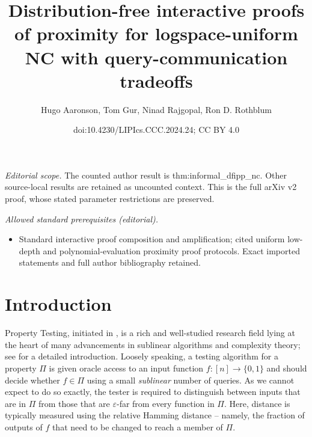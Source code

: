 \documentclass[10pt,a4paper]{article}
\title{Distribution-free interactive proofs of proximity for logspace-uniform NC with query-communication tradeoffs}
\author{Hugo Aaronson, Tom Gur, Ninad Rajgopal, Ron D. Rothblum}
\date{doi:10.4230/LIPIcs.CCC.2024.24; CC BY 4.0}
\begin{document}
\maketitle
\setcounter{section}{1}
\noindent\textit{Editorial scope.} The counted author result is thm:informal\_dfipp\_nc. Other source-local results are retained as uncounted context. This is the full arXiv v2 proof, whose stated parameter restrictions are preserved.\par\medskip
\noindent\textit{Allowed standard prerequisites (editorial).}\begin{itemize}
\item Standard interactive proof composition and amplification; cited uniform low-depth and polynomial-evaluation proximity proof protocols. Exact imported statements and full author bibliography retained.
\end{itemize}\medskip
\section{Introduction}
Property Testing, initiated in \cite{RS96, GGR98}, is a rich and well-studied research field lying at the heart of many advancements in sublinear algorithms and complexity theory; see \cite{Gol17_book,BY22} for a detailed introduction. Loosely speaking, a testing algorithm for a property $\Pi$ is given oracle access to an input function $f:[n]\rightarrow\{0,1\}$ and should decide whether $f \in \Pi$ using a small \emph{sublinear} number of queries. As  we cannot expect to do so exactly, the tester is required to distinguish between inputs that are in $\Pi$ from those that are $\varepsilon$-far from every function in $\Pi$. Here, distance is typically measured using the relative Hamming distance -- namely, the fraction of outputs of $f$ that need to be changed to reach a member of $\Pi$.
\end{document}

